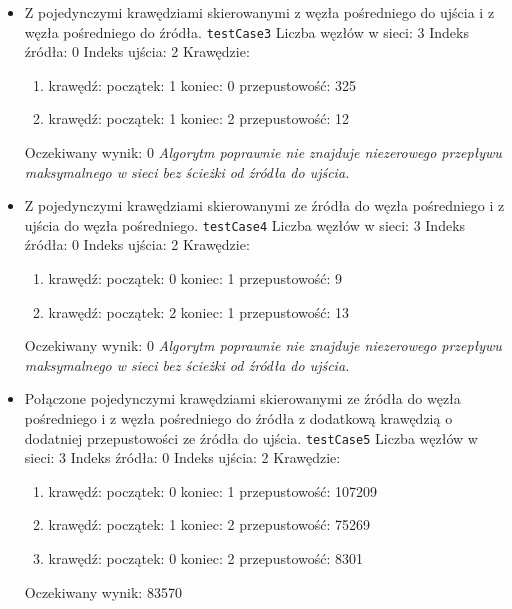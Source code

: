\begin{itemize}[nosep]
    \item Z pojedynczymi krawędziami skierowanymi z węzła pośredniego do ujścia
    i z węzła pośredniego do źródła.
    \texttt{testCase3}
    Liczba węzłów w sieci: 3
    Indeks źródła: 0
    Indeks ujścia: 2
    Krawędzie:
    \begin{enumerate}[nosep]
        \item krawędź:
        początek: 1
        koniec: 0
        przepustowość: 325
        \item krawędź:
        początek: 1
        koniec: 2
        przepustowość: 12
    \end{enumerate}
    Oczekiwany wynik: 0
    \emph{Algorytm poprawnie nie znajduje niezerowego
    przepływu maksymalnego w sieci bez ścieżki od źródła do ujścia.}

    \item Z pojedynczymi krawędziami skierowanymi ze źródła do węzła pośredniego
    i z ujścia do węzła pośredniego.
    \texttt{testCase4}
    Liczba węzłów w sieci: 3
    Indeks źródła: 0
    Indeks ujścia: 2
    Krawędzie:
    \begin{enumerate}[nosep]
        \item krawędź:
        początek: 0
        koniec: 1
        przepustowość: 9
        \item krawędź:
        początek: 2
        koniec: 1
        przepustowość: 13
    \end{enumerate}
    Oczekiwany wynik: 0
    \emph{Algorytm poprawnie nie znajduje niezerowego
    przepływu maksymalnego w sieci bez ścieżki od źródła do ujścia.}

    \item Połączone pojedynczymi krawędziami skierowanymi ze źródła do węzła
    pośredniego i z węzła pośredniego do źródła z dodatkową krawędzią o
    dodatniej przepustowości ze źródła do ujścia.
    \texttt{testCase5}
    Liczba węzłów w sieci: 3
    Indeks źródła: 0
    Indeks ujścia: 2
    Krawędzie:
    \begin{enumerate}[nosep]
        \item krawędź:
        początek: 0
        koniec: 1
        przepustowość: 107209
        \item krawędź:
        początek: 1
        koniec: 2
        przepustowość: 75269
        \item krawędź:
        początek: 0
        koniec: 2
        przepustowość: 8301
    \end{enumerate}
    Oczekiwany wynik: 83570


\end{itemize}
